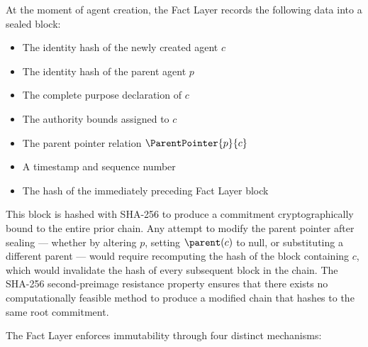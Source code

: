 At the moment of agent creation, the Fact Layer records the following data into a sealed block:
\begin{itemize}
    \item The identity hash of the newly created agent $c$
    \item The identity hash of the parent agent $p$
    \item The complete purpose declaration of $c$
    \item The authority bounds assigned to $c$
    \item The parent pointer relation $\ParentPointer{p}{c}$
    \item A timestamp and sequence number
    \item The hash of the immediately preceding Fact Layer block
\end{itemize}

This block is hashed with SHA-256 to produce a commitment cryptographically bound to the entire prior chain. Any attempt to modify the parent pointer after sealing — whether by altering $p$, setting $\parent(c)$ to null, or substituting a different parent — would require recomputing the hash of the block containing $c$, which would invalidate the hash of every subsequent block in the chain. The SHA-256 second-preimage resistance property ensures that there exists no computationally feasible method to produce a modified chain that hashes to the same root commitment.

The Fact Layer enforces immutability through four distinct mechanisms:

